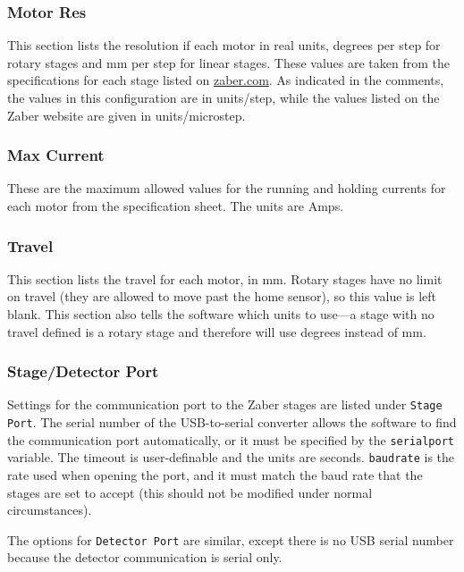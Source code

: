 \subsubsection{Motor Res}

This section lists the resolution if each motor in real units, degrees per step
for rotary stages and mm per step for linear stages. These values are taken from
the specifications for each stage listed on \url{zaber.com}. As indicated in the
comments, the values in this configuration are in units/step, while the values
listed on the Zaber website are given in units/microstep.

\subsubsection{Max Current}

These are the maximum allowed values for the running and holding currents for
each motor from the specification sheet. The units are Amps.

\subsubsection{Travel}

This section lists the travel for each motor, in mm. Rotary stages have no limit
on travel (they are allowed to move past the home sensor), so this value is left
blank. This section also tells the software which units to use---a stage with no
travel defined is a rotary stage and therefore will use degrees instead of mm.

\subsubsection{Stage/Detector Port}

Settings for the communication port to the Zaber stages are listed under
\texttt{Stage Port}. The serial number of the USB-to-serial converter allows the
software to find the communication port automatically, or it must be specified
by the \texttt{serialport} variable. The timeout is user-definable and the units
are seconds. \texttt{baudrate} is the rate used when opening the port, and it
must match the baud rate that the stages are set to accept (this should not be
modified under normal circumstances).

The options for \texttt{Detector Port} are similar, except there is no USB
serial number because the detector communication is serial only.

